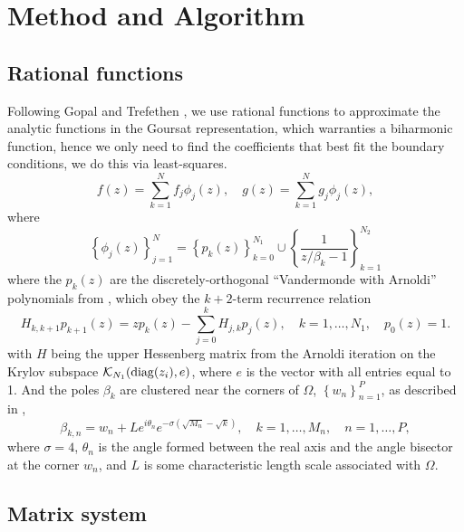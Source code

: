
\section{Method and Algorithm}

\subsection{Rational functions}
Following Gopal and Trefethen \cite{Gopal19}, we use rational functions to approximate the analytic functions in the Goursat representation, which warranties a biharmonic function, hence we only need to find the coefficients that best fit the boundary conditions, we do this via least-squares.
\begin{equation}
f(z) = \sum_{k=1}^N f_j \phi_j(z), \quad g(z) = \sum_{k=1}^N g_j \phi_j(z),
\end{equation}
where 
\begin{equation}
\left\{\phi_j(z)\right\}_{j=1}^{N} = \left\{p_k(z)\right\}_{k=0}^{N_1} \cup \left\{\frac{1}{z/\beta_k-1}\right\}_{k=1}^{N_2}
\end{equation}
where the $p_k(z)$ are the discretely-orthogonal ``Vandermonde with Arnoldi'' polynomials from \cite{Brubeck19}, which obey the $k+2$-term recurrence relation
\begin{equation}
H_{k,k+1} p_{k+1}(z) = z p_k(z) - \sum_{j=0}^k H_{j,k} p_j(z),\quad k=1,\ldots,N_1, \quad p_0(z)=1.
\end{equation}
with $H$ being the upper Hessenberg matrix from the Arnoldi iteration on the Krylov subspace $\mathcal{K}_{N_1}(\operatorname{diag}(z_i), e)$, where $e$ is the vector with all entries equal to 1. And the poles $\beta_k$ are clustered near the corners of $\Omega$, $\left\{w_n\right\}_{n=1}^P$, as described in \cite{Gopal19},
\begin{equation}
\beta_{k,n} = w_n + Le^{i\theta_n} e^{-\sigma (\sqrt{M_n}-\sqrt{k})}, \quad k=1,\ldots,M_n,\quad n=1,\ldots,P,
\end{equation}
where $\sigma=4$, $\theta_n$ is the angle formed between the real axis and the angle bisector at the corner $w_n$, and $L$ is some characteristic length scale associated with $\Omega$.









\subsection{Matrix system}



